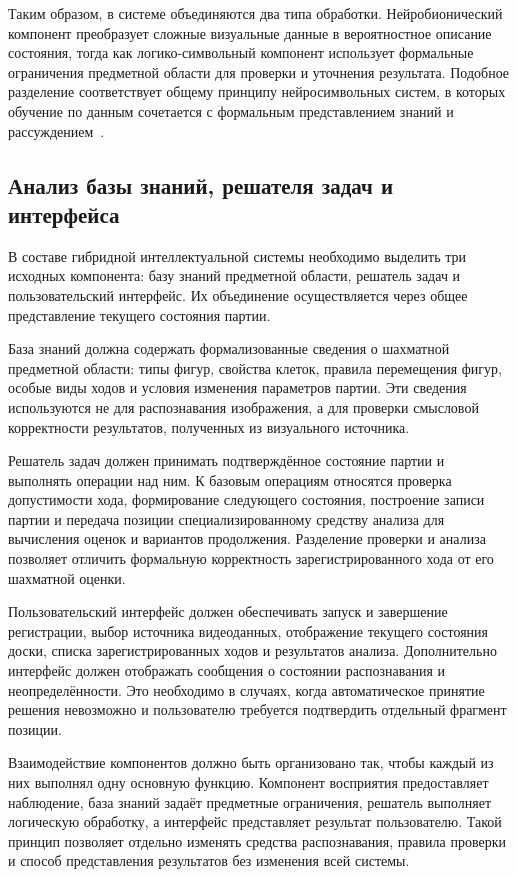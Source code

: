 Таким образом, в системе объединяются два типа обработки. Нейробионический компонент преобразует сложные визуальные данные в вероятностное описание состояния, тогда как логико-символьный компонент использует формальные ограничения предметной области для проверки и уточнения результата. Подобное разделение соответствует общему принципу нейросимвольных систем, в которых обучение по данным сочетается с формальным представлением знаний и рассуждением~\cite{Garcez2008}.

\subsection{Анализ базы знаний, решателя задач и интерфейса}

В составе гибридной интеллектуальной системы необходимо выделить три исходных компонента: базу знаний предметной области, решатель задач и пользовательский интерфейс. Их объединение осуществляется через общее представление текущего состояния партии.

База знаний должна содержать формализованные сведения о шахматной предметной области: типы фигур, свойства клеток, правила перемещения фигур, особые виды ходов и условия изменения параметров партии. Эти сведения используются не для распознавания изображения, а для проверки смысловой корректности результатов, полученных из визуального источника.

Решатель задач должен принимать подтверждённое состояние партии и выполнять операции над ним. К базовым операциям относятся проверка допустимости хода, формирование следующего состояния, построение записи партии и передача позиции специализированному средству анализа для вычисления оценок и вариантов продолжения. Разделение проверки и анализа позволяет отличить формальную корректность зарегистрированного хода от его шахматной оценки.

Пользовательский интерфейс должен обеспечивать запуск и завершение регистрации, выбор источника видеоданных, отображение текущего состояния доски, списка зарегистрированных ходов и результатов анализа. Дополнительно интерфейс должен отображать сообщения о состоянии распознавания и неопределённости. Это необходимо в случаях, когда автоматическое принятие решения невозможно и пользователю требуется подтвердить отдельный фрагмент позиции.

Взаимодействие компонентов должно быть организовано так, чтобы каждый из них выполнял одну основную функцию. Компонент восприятия предоставляет наблюдение, база знаний задаёт предметные ограничения, решатель выполняет логическую обработку, а интерфейс представляет результат пользователю. Такой принцип позволяет отдельно изменять средства распознавания, правила проверки и способ представления результатов без изменения всей системы.

